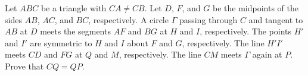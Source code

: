 Let $ABC$ be a triangle with $CA \neq CB$. Let $D$, $F$, and $G$ be the midpoints of the sides $AB$, $AC$, and $BC$, respectively. A circle $\Gamma$ passing through $C$ and tangent to $AB$ at $D$ meets the segments $AF$ and $BG$ at $H$ and $I$, respectively. The points $H'$ and $I'$ are symmetric to $H$ and $I$ about $F$ and $G$, respectively. The line $H'I'$ meets $CD$ and $FG$ at $Q$ and $M$, respectively. The line $CM$ meets $\Gamma$ again at $P$. Prove that $CQ = QP$.
